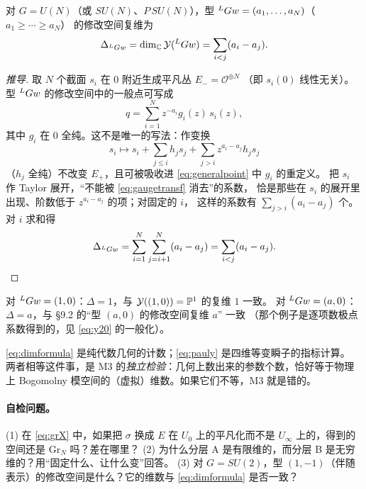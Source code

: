 \begin{proposition}[修改空间的维数]\label{prop:dim}
对 $G=U(N)$（或 $SU(N)$、$P\,SU(N)$），型 ${}^{L}G w=(a_1,\dots,a_N)$（$a_1\ge\cdots\ge a_N$）
的修改空间复维为
\begin{equation}
\Delta_{{}^{L}G w}=\dim_{\mathbb{C}}\mathcal{Y}({}^{L}G w)=\sum_{i<j}(a_i-a_j).
\label{eq:dimformula}
\end{equation}
\end{proposition}

\begin{proof}[推导]
取 $N$ 个截面 $s_i$ 在 $0$ 附近生成平凡丛 $E_-=\mathcal{O}^{\oplus N}$
（即 $s_i(0)$ 线性无关）。型 ${}^{L}G w$ 的修改空间中的一般点可写成
\begin{equation}
q=\sum_{i=1}^N z^{-a_i}g_i(z)\,s_i(z),
\label{eq:generalpoint}
\end{equation}
其中 $g_i$ 在 $0$ 全纯。这不是唯一的写法：作变换
\begin{equation}
s_i\longmapsto s_i+\sum_{j\le i}h_js_j+\sum_{j>i}z^{a_i-a_j}h_js_j
\label{eq:gaugetransf}
\end{equation}
（$h_j$ 全纯）不改变 $E_+$，且可被吸收进 \eqref{eq:generalpoint} 中 $g_i$ 的重定义。
把 $s_i$ 作 Taylor 展开，“不能被 \eqref{eq:gaugetransf} 消去”的系数，
恰是那些在 $s_i$ 的展开里出现、阶数低于 $z^{a_i-a_j}$ 的项；对固定的 $i$，
这样的系数有 $\sum_{j>i}(a_i-a_j)$ 个。对 $i$ 求和得
\begin{equation}
\Delta_{{}^{L}G w}
=\sum_{i=1}^N\sum_{j=i+1}^N(a_i-a_j)
=\sum_{i<j}(a_i-a_j).
\label{eq:dimderive}
\end{equation}
\end{proof}

\begin{example}[两个检验]
对 ${}^{L}G w=(1,0)$：$\Delta=1$，与 $\mathcal{Y}((1,0))=\mathbb{P}^1$ 的复维 $1$ 一致。
对 ${}^{L}G w=(a,0)$：$\Delta=a$，与 §9.2 的“型 $(a,0)$ 的修改空间复维 $a$” 一致
（那个例子是逐项数极点系数得到的，见 \eqref{eq:y20} 的一般化）。\pA{}
\end{example}

\begin{remark}[为什么维数公式必须与指标理论一致]
\eqref{eq:dimformula} 是纯代数几何的计数；\eqref{eq:pauly} 是四维等变瞬子的指标计算。
两者相等这件事，是 M3 的\emph{独立检验}：几何上数出来的参数个数，恰好等于物理上
Bogomolny 模空间的（虚拟）维数。如果它们不等，M3 就是错的。\pB{}
\end{remark}

\paragraph{自检问题。}
(1) 在 \eqref{eq:grX} 中，如果把 $\sigma$ 换成 $E$ 在 $U_0$ 上的平凡化而不是
$U_\infty$ 上的，得到的空间还是 $\mathrm{Gr}_N$ 吗？差在哪里？
(2) 为什么分层 A 是有限维的，而分层 B 是无穷维的？用“固定什么、让什么变”回答。
(3) 对 $G=SU(2)$，型 $(1,-1)$（伴随表示）的修改空间是什么？它的维数与
\eqref{eq:dimformula} 是否一致？


